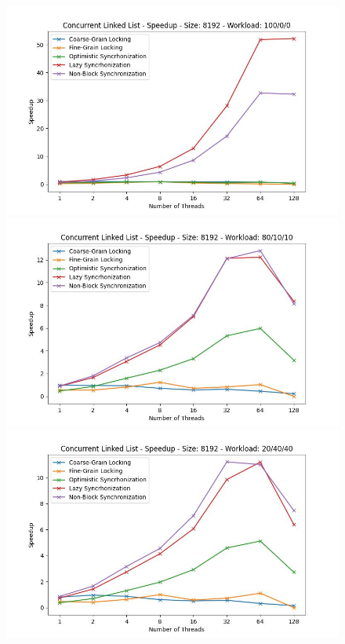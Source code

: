 \documentclass[../final_report.tex]{subfiles}
\begin{document}
\begin{figure}[H]
    \centering
        \includegraphics[scale=0.4]{outFiles/plots/concurrent_data_structs_all_speedup_8192_100_0_0.jpg}
        \includegraphics[scale=0.4]{outFiles/plots/concurrent_data_structs_all_speedup_8192_80_10_10.jpg}
        \includegraphics[scale=0.4]{outFiles/plots/concurrent_data_structs_all_speedup_8192_20_40_40.jpg}

\end{figure}
\end{document}

